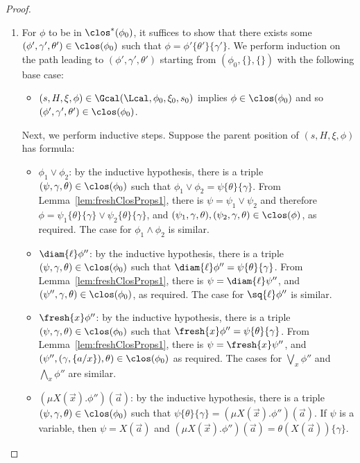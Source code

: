 \begin{proof}
	\begin{enumerate}
		\item 
		For $\phi$ to be in $\clos^*(\phi_0)$, it suffices to show that there exists some $(\phi', \gamma', \theta') \in \clos(\phi_0)$ such that $\phi = \phi'\{\theta'\}\{\gamma'\}$. 
		We perform induction on the path leading to $(\phi', \gamma', \theta')$ starting from $(\phi_0, \{\}, \{\})$ with the following base case:
		\begin{itemize}
			\item $(s, H, \xi, \phi) \in \Gcal(\Lcal, \phi_0,\xi_0, s_0)$ implies $\phi \in \clos(\phi_0)$ and so $(\phi', \gamma', \theta') \in \clos(\phi_0)$.
		\end{itemize}
		Next, we perform inductive steps. Suppose the parent position of $(s, H,\xi,\phi)$ has formula:
		\begin{itemize}
			\item $\phi_1 \lor \phi_2$: by the inductive hypothesis, there is a triple $(\psi,\gamma,\theta)\in\clos(\phi_0)$ such that $\phi_1\lor\phi_2=\psi\{\theta\}\{\gamma\}$. From Lemma~\ref{lem:freshClosProps1}, there is $\psi=\psi_1\lor\psi_2$ and therefore $\phi=\psi_1\{\theta\}\{\gamma\}\lor\psi_2\{\theta\}\{\gamma\}$, and $(\psi_1,\gamma,\theta),(\psi_2,\gamma,\theta)\in\clos(\phi)$, as required. The case for  $\phi_1 \land \phi_2$ is similar.
			\item $\diam{\ell}\phi''$: 
			by the inductive hypothesis, there is a triple $(\psi,\gamma, \theta)\in\clos(\phi_0)$ such that $\diam{\ell}\phi''=\psi\{\theta\}\{\gamma\}$.
			From Lemma~\ref{lem:freshClosProps1}, there is $\psi=\diam{\ell}\psi''$, and $(\psi'', \gamma,\theta)\in \clos(\phi_0)$, as required. 
			The case for $\sq{\ell}\phi''$ is similar.
			\item $\fresh{x}\phi''$:
			by the inductive hypothesis, there is a triple $(\psi, \gamma, \theta) \in \clos(\phi_0)$ such that $\fresh{x}\phi''=\psi\{\theta\}\{\gamma\}$.
			From Lemma~\ref{lem:freshClosProps1}, there is $\psi=\fresh{x}\psi''$, and $(\psi'', (\gamma, \{a/x\}), \theta) \in \clos(\phi_0)$ as required.
			The cases for $\bigvee_x \phi''$ and $\bigwedge_x \phi''$ are similar. 
			\item $(\mu X(\vec x).\phi'')(\vec a)$: by the inductive hypothesis, there is a triple $(\psi, \gamma,\theta) \in \clos(\phi_0)$ such that $\psi\{\theta\}\{\gamma\} = (\mu X(\vec x).\phi'')(\vec a)$. 
			If $\psi$ is a variable, then $\psi = X(\vec a)$ and $(\mu X(\vec x).\phi'')(\vec a) = \theta(X(\vec a))\{\gamma\}$. 

\end{itemize}
\end{enumerate}
\end{proof}
